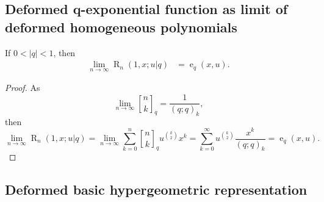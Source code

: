 \documentclass{cimart}
\newcommand{\qbinom}{\genfrac{[}{]}{0pt}{}}
\DeclareMathOperator{\ope}{e}
\DeclareMathOperator{\opR}{R}
\begin{document}
\subsection{Deformed q-exponential function as limit of deformed homogeneous polynomials}

\begin{theorem}
If $0<\vert q\vert<1$, then
    \begin{align}
        \lim_{n\rightarrow\infty}\opR_{n}(1,x;u|q)&=\ope_{q}(x,u).
    \end{align}
\end{theorem}
\begin{proof}
As
\begin{equation*}
    \lim_{n\rightarrow\infty}\qbinom{n}{k}_{q}=\frac{1}{(q;q)_{k}},
\end{equation*}
then
\begin{equation*}
    \lim_{n\rightarrow\infty}\opR_{n}(1,x;u|q)=\lim_{n\rightarrow\infty}\sum_{k=0}^{n}\qbinom{n}{k}_{q}u^{\binom{k}{2}}x^k=\sum_{k=0}^{\infty}u^{\binom{k}{2}}\frac{x^k}{(q;q)_{k}}=\ope_{q}(x,u).
\end{equation*}
\end{proof}



\subsection{Deformed basic hypergeometric representation}
\end{document}

